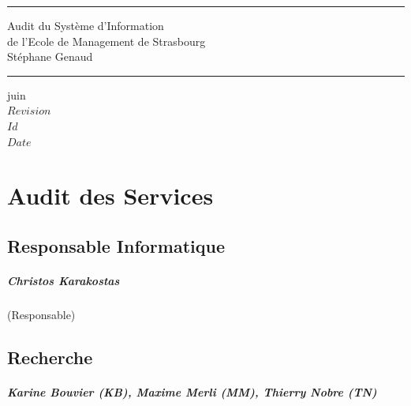 \documentclass{book}
\begin{document}
\newcommand{\motcle}[1]{\index{#1}\emph{#1}}
\newcommand{\sre}{service relations entreprises\xspace}
\newcommand{\sop}{service organisation et process\xspace}
\newcommand{\scom}{service communication\xspace}
\newcommand{\sconc}{service concours\xspace}


\thispagestyle{empty}
\rhead[]{}
\pagestyle{fancy}
\setlength{\parindent}{0mm}
\setlength{\parskip}{0mm}
\rule{\linewidth}{1mm}
\begin{center}
\Large{Audit du Système d'Information}\\[5mm]
\Large{de l'Ecole de Management de Strasbourg}\\[5mm]
\large{Stéphane Genaud}
\rule{\linewidth}{1mm}
\end{center}
\begin{center}
juin  \\
\textrm{
$Revision$\\
$Id$\\
$Date$\\
}
\end{center}

\tableofcontents
\newpage

 
 

\chapter{Audit des Services}
 

\section{Responsable Informatique}

\paragraph{Christos Karakostas} (Responsable)


\section{Recherche}
\paragraph{Karine Bouvier (KB), Maxime Merli (MM), Thierry Nobre (TN)}
\end{document}
